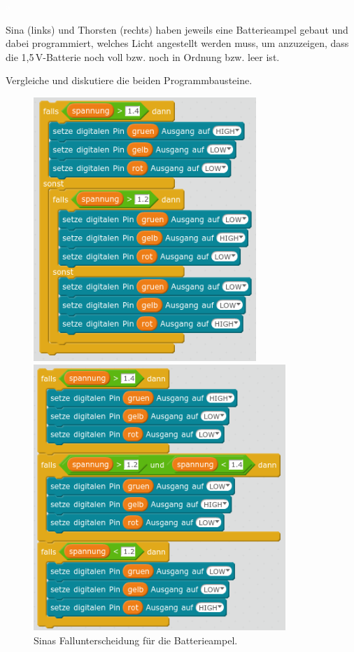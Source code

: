 \documentclass[ngerman, 11pt]{scrreprt}
\begin{document}
	\setcounter{chapter}{5}
	\setcounter{section}{1}

	\textcolor{white}{a}
	
	\vspace{2cm}\par
	
	Sina (links) und Thorsten (rechts) haben jeweils eine Batterieampel gebaut und dabei programmiert, welches Licht angestellt werden muss, um anzuzeigen, dass die 1,5\,V-Batterie noch voll bzw. noch in Ordnung bzw. leer ist.
	
	Vergleiche und diskutiere die beiden Programmbausteine.
	
	\begin{figure}[H]
		\begin{minipage}{0.48\textwidth}
			\centering
			\includegraphics[width=0.75\textwidth]{../pics/batterieampel-1.png}
			\caption{Sinas Fallunterscheidung für die Batterieampel.}
		\end{minipage}
		\hfill
		\begin{minipage}{0.48\textwidth}
			\centering
			\includegraphics[width=0.85\textwidth]{../pics/batterieampel-2.png}

\end{minipage}
\end{figure}
\end{document}
